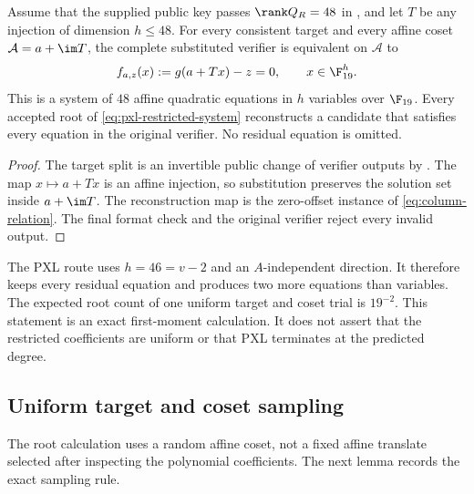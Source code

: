 \begin{proposition}
\label{prop:pxl-level1-transverse}
Assume that the supplied public key passes $\rank Q_R=48$ in
, and let $T$ be any injection of dimension
$h\le48$.  For every consistent target and every affine coset
$\mathcal A=a+\im T$, the complete substituted verifier is equivalent on
$\mathcal A$ to
\begin{equation}
 f_{a,z}(x):=g(a+Tx)-z=0,
 \qquad x\in\F_{19}^{h}.
 \label{eq:pxl-restricted-system}
\end{equation}
This is a system of $48$ affine quadratic equations in $h$ variables over
$\F_{19}$.  Every accepted root of \eqref{eq:pxl-restricted-system}
reconstructs a candidate that satisfies every equation in the original
verifier.  No residual equation is omitted.
\end{proposition}

\begin{proof}
The target split is an invertible public change of verifier outputs by
.  The map $x\mapsto a+Tx$ is an affine injection, so
substitution preserves the solution set inside $a+\im T$.  The reconstruction
map is the zero-offset instance of \eqref{eq:column-relation}.  The final
format check and the original verifier reject every invalid output.
\end{proof}

The PXL route uses $h=46=v-2$ and an $A$-independent direction.  It therefore
keeps every residual equation and produces two more equations than variables.
The expected root count of one uniform target and coset trial is $19^{-2}$.
This statement is an exact first-moment calculation.  It does not assert that
the restricted coefficients are uniform or that PXL terminates at the
predicted degree.

\subsection{Uniform target and coset sampling}

The root calculation uses a random affine coset, not a fixed affine
translate selected after inspecting the polynomial coefficients.  The next
lemma records the exact sampling rule.

